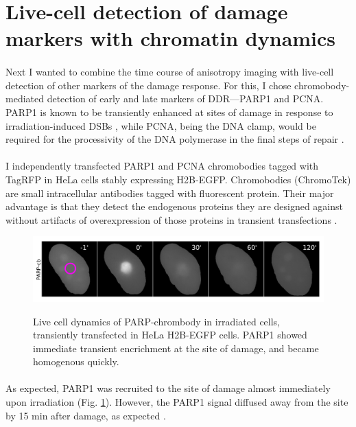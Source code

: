 \section{Live-cell detection of damage markers with chromatin dynamics}

\paragraph*{}  Next I wanted to combine the time course of anisotropy imaging with live-cell detection of other markers of the damage response. For this, I chose chromobody-mediated detection of early and late markers of DDR—PARP1 and PCNA. PARP1 is known to be transiently enhanced at sites of damage in response to irradiation-induced DSBs \cite{chou2010chromatin,qi2019multiple}, while PCNA, being the DNA clamp, would be required for the processivity of the DNA polymerase in the final steps of repair \cite{moldovan2007pcna}. 

\paragraph*{} I independently transfected PARP1 and PCNA chromobodies tagged with TagRFP in HeLa cells stably expressing H2B-EGFP. Chromobodies (ChromoTek) are small intracellular antibodies tagged with fluorescent protein. Their major advantage is that they detect the endogenous proteins they are designed against without artifacts of overexpression of those proteins in transient transfections \cite{BURGESS20141703,panza2015live}.

\begin{figure}[H]
    {\hfill\includegraphics[clip, width=1\linewidth]{figures/parp.png}\hspace*{\fill}}
    \caption{Live cell dynamics of PARP-chrombody in irradiated cells, transiently transfected in HeLa H2B-EGFP cells. PARP1 showed immediate transient encrichment at the site of damage, and became homogenous quickly.}
    {\label{fig:parp}}
\end{figure}

\paragraph*{} As expected, PARP1 was recruited to the site of damage almost immediately upon irradiation (Fig. \ref{fig:parp}). However, the PARP1 signal diffused away from the site by 15 min after damage, as expected \cite{haince2008parp1,mortusewicz2007feedback}. 


